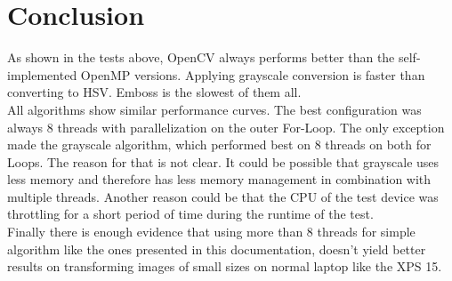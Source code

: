 \chapter{Conclusion}

\noindent
As shown in the tests above, OpenCV always performs better than the self-implemented OpenMP versions. Applying grayscale conversion is faster than converting to HSV. Emboss is the slowest of them all. \\

\noindent
All algorithms show similar performance curves. The best configuration was always 8 threads with parallelization on the outer For-Loop. The only exception made the grayscale algorithm, which performed best on 8 threads on both for Loops. The reason for that is not clear. It could be possible that grayscale uses less memory and therefore has less memory management in combination with multiple threads. Another reason could be that the CPU of the test device was throttling for a short period of time during the runtime of the test.\\

\noindent
Finally there is enough evidence that using more than 8 threads for simple algorithm like the ones presented in this documentation, doesn't yield better results on transforming images of small sizes on normal laptop like the XPS 15.
